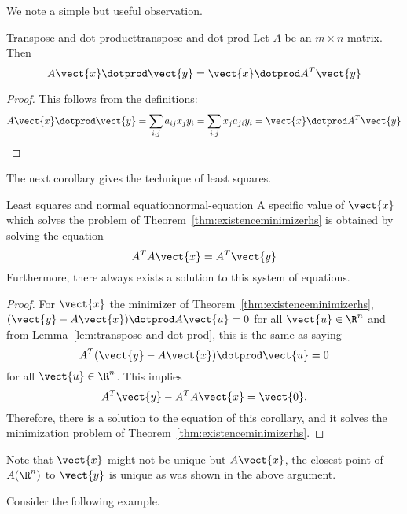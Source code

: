 We note a simple but useful observation.

\begin{lemma}{Transpose and dot product}{transpose-and-dot-prod}
Let $A$ be an $m\times n$-matrix. Then
\begin{equation*}
A\vect{x} \dotprod \vect{y} = \vect{x}\dotprod A^T\vect{y}
\end{equation*}
\end{lemma}

\begin{proof}
This follows from the definitions:
\[ A\vect{x} \dotprod \vect{y}=\sum_{i,j}a_{ij}x_{j} y_{i}
=\sum_{i,j}x_{j} a_{ji} y_{i}= \vect{x} \dotprod A^T\vect{y}
\] \end{proof}

The next corollary gives the technique of least squares.

\begin{corollary}{Least squares and normal equation}{normal-equation}
A specific value of $\vect{x}$ which solves the problem of Theorem~\ref{thm:existenceminimizerhs} is obtained by solving the equation
\begin{equation*}
A^TA\vect{x}=A^T\vect{y}
\end{equation*}
Furthermore, there always exists a solution to this system of equations.
\end{corollary}

\begin{proof}
For $\vect{x}$ the minimizer of Theorem~\ref{thm:existenceminimizerhs}, $(
\vect{y}-A\vect{x}) \dotprod A \vect{u} =0$ for all $\vect{u} \in \R^{n}$ and from
Lemma~\ref{lem:transpose-and-dot-prod}, this is the same as saying
\begin{equation*}
A^T(\vect{y}-A\vect{x}) \dotprod \vect{u}=0
\end{equation*}
for all $\vect{u} \in \R^{n}$. This implies
\begin{equation*}
A^T\vect{y}-A^TA\vect{x}=\vect{0}.
\end{equation*}
Therefore, there is a solution to the equation of this corollary, and it
solves the minimization problem of Theorem~\ref{thm:existenceminimizerhs}.
\end{proof}

Note that $\vect{x}$ might not be unique but $A\vect{x}$, the closest
point of $A(\R^{n})$ to $\vect{y}$ is unique as was shown in the
above argument.

Consider the following example.

